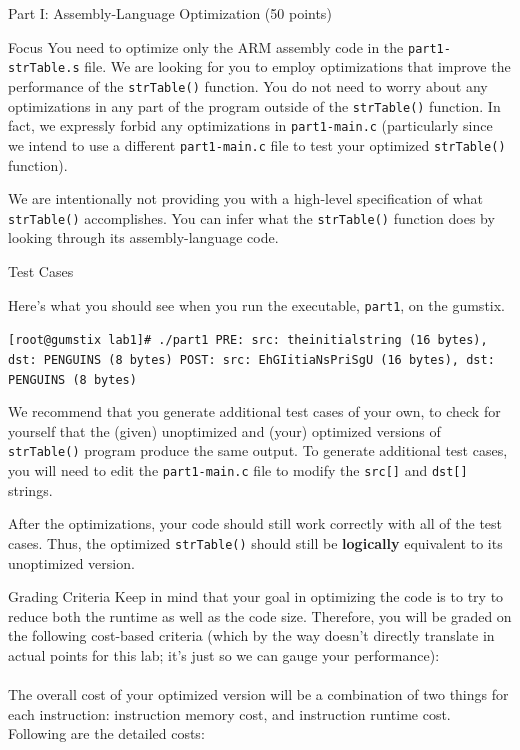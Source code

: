 \documentclass{article}
\begin{document}
\begin{section}{Part I: Assembly-Language Optimization (50 points)}
\begin{subsection}{Focus}
			You need to optimize only the ARM assembly
			code in the \texttt{part1-strTable.s} file. We
			are looking for you to employ optimizations
			that improve the performance of the
			\texttt{strTable()} function. You do not need
			to worry about any optimizations in any part
			of the program outside of the
			\texttt{strTable()} function. In fact, we
			expressly forbid any optimizations in
			\texttt{part1-main.c} (particularly since we
			intend to use a different
			\texttt{part1-main.c} file to test your
			optimized \texttt{strTable()} function).
	
			We are intentionally not providing you with a
			high-level specification of what
			\texttt{strTable()} accomplishes. You can
			infer what the \texttt{strTable()} function
			does by looking through its assembly-language
			code.

		\end{subsection}
        \vspace*{0.2in}
		\begin{subsection}{Test Cases}

			\noindent
			Here's what you should see when you run the
			executable, \texttt{part1}, on the
			gumstix. \newline

			\noindent \texttt{[root@gumstix lab1]\#
			./part1 \newline PRE: src: theinitialstring
			(16 bytes), dst: PENGUINS (8 bytes) \newline
			POST: src: EhGIitiaNsPriSgU (16 bytes), dst:
			PENGUINS (8 bytes) \newline }

			We recommend that you generate additional test
			cases of your own, to check for yourself that
			the (given) unoptimized and (your) optimized
			versions of \texttt{strTable()} program
			produce the same output. To generate
			additional test cases, you will need to edit
			the \texttt{part1-main.c} file to modify the
			\texttt{src[]} and \texttt{dst[]} strings.

			After the optimizations, your code should
			still work correctly with all of the test
			cases. Thus, the optimized \texttt{strTable()}
			should still be \textbf{logically} equivalent
			to its unoptimized version.

		\end{subsection}
        \vspace*{0.2in}
        \begin{subsection}{Grading Criteria}
        Keep in mind that your goal in optimizing the code is to try to reduce both the runtime as well as the code size. Therefore, you will be graded on the following cost-based criteria (which by the way doesn't directly translate in actual points for this lab; it's just so we can gauge your performance): \\ \\
        The overall cost of your optimized version will be a combination of two things for each instruction: instruction memory cost, and instruction runtime cost. Following are the detailed costs:\\


\end{subsection}
\end{section}
\end{document}
